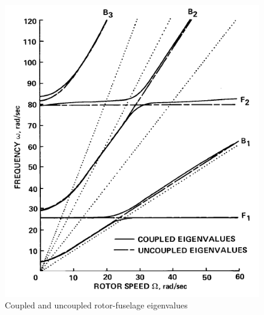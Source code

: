 \smallskip
\begin{figure}[h]
	\begin{center}
		\centering  		 		
		\includegraphics[width=0.85\linewidth]{PICTURES/3b_coupling/1.png}
	\end{center}
	\caption {Coupled and uncoupled rotor-fuselage eigenvalues}
\end{figure}
